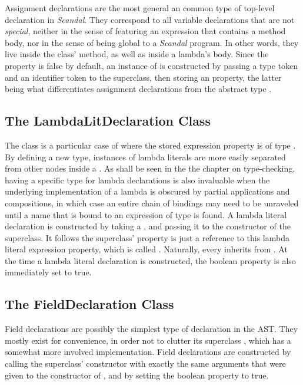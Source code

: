 Assignment declarations are the most general an common type of top-level declaration in \emph{Scandal}. They correspond to all variable declarations that are not \emph{special}, neither in the sense of featuring an expression that contains a method body, nor in the sense of being global to a \emph{Scandal} program. In other words, they live inside the  class'  method, as well as inside a lambda's body. Since the  property is false by default, an instance of  is constructed by passing a type token and an identifier token to the superclass, then storing an  property, the latter being what differentiates assignment declarations from the abstract type .

\subsection{The LambdaLitDeclaration Class}

The  class is a particular case of  where the stored expression property is of type . By defining a new type, instances of lambda literals are more easily separated from other nodes inside a . As shall be seen in the the chapter on type-checking, having a specific type for lambda declarations is also invaluable when the underlying implementation of a lambda is obscured by partial applications and compositions, in which case an entire chain of bindings may need to be unraveled until a name that is bound to an expression of type  is found. A lambda literal declaration is constructed by taking a , and passing it to the constructor of the superclass. It follows the superclass'  property is just a reference to this lambda literal expression property, which is called . Naturally, every  inherits from . At the time a lambda literal declaration is constructed, the  boolean property is also immediately set to true.

\subsection{The FieldDeclaration Class}

Field declarations are possibly the simplest type of declaration in the AST. They mostly exist for convenience, in order not to clutter its superclass , which has a somewhat more involved implementation. Field declarations are constructed by calling the superclass' constructor with exactly the same arguments that were given to the constructor of , and by setting the  boolean property to true.

